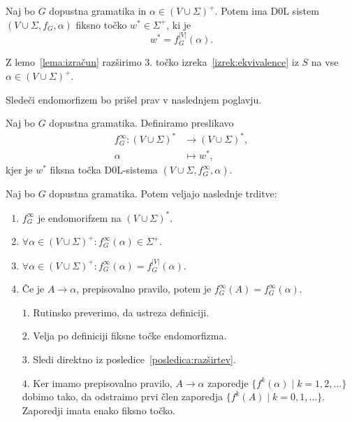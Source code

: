 \documentclass[fin1, tisk]{fmfdelo}
\providecommand{\abs}[1]{\left\lvert #1 \right\rvert}
\theoremstyle{definition}
\begin{document}
\begin{posledica}\label{posledica:razširtev}
    Naj bo $G$ dopustna gramatika in $\alpha \in (V \cup \Sigma)^+$. Potem ima D$0$L sistem
    $(V \cup \Sigma, f_G, \alpha)$ fiksno točko $ w^* \in \Sigma^+$, ki je
    \[
        w^* = f_G^{\abs{V}}(\alpha).
    \]
\end{posledica}

\begin{dokaz}
    Z lemo~\ref{lema:izračun} razširimo $3.$ točko izreka~\ref{izrek:ekvivalence} iz $S$ na 
    vse $\alpha \in (V \cup \Sigma)^+$.
\end{dokaz}

Sledeči endomorfizem bo prišel prav v naslednjem poglavju.

\begin{definicija}\label{def:InftyEndo}
    Naj bo $G$ dopustna gramatika. Definiramo preslikavo
    \begin{align*}
        f_G^\infty \colon (V \cup \Sigma)^* &\to (V \cup \Sigma)^*, \\
        \alpha &\mapsto w^*,
    \end{align*}
    kjer je $w^*$ fiksna točka D$0$L-sistema $(V \cup \Sigma, f_G^\infty, \alpha)$.
\end{definicija}

\begin{trditev}
    Naj bo $G$ dopustna gramatika. Potem veljajo naslednje trditve:
    \begin{enumerate}
        \item $f_G^\infty$ je endomorifzem na $(V \cup \Sigma)^*$.
        \item $\forall \alpha \in (V \cup \Sigma)^+ \colon f_G^\infty(\alpha) \in \Sigma^+$.
        \item $\forall \alpha \in (V \cup \Sigma)^+ \colon f_G^\infty(\alpha) = f_G^{\abs{V}}(\alpha)$.
        \item Če je $A \rightarrow \alpha$, prepisovalno pravilo, potem je
        $f_G^\infty(A) = f_G^\infty(\alpha)$.
    \end{enumerate}
\end{trditev}

\begin{dokaz}
    \mbox{}
    \begin{itemize}
        \item[$1.$] Rutinsko preverimo, da ustreza definiciji.
        \item [$2.$] Velja po definiciji fiksne točke endomorfizma.
        \item[$3.$] Sledi direktno iz posledice~\ref{posledica:razširtev}.
        \item[$4.$] Ker imamo prepisovalno pravilo, $A \rightarrow \alpha$ zaporedje
        $\{ f^k(\alpha) \mid k = 1, 2, \ldots \}$ dobimo tako, da odstraimo prvi člen zaporedja
        $\{ f^k(A) \mid k = 0, 1, \ldots \}$. Zaporedji imata enako fiksno točko.
    \end{itemize}
\end{dokaz}
\end{document}
